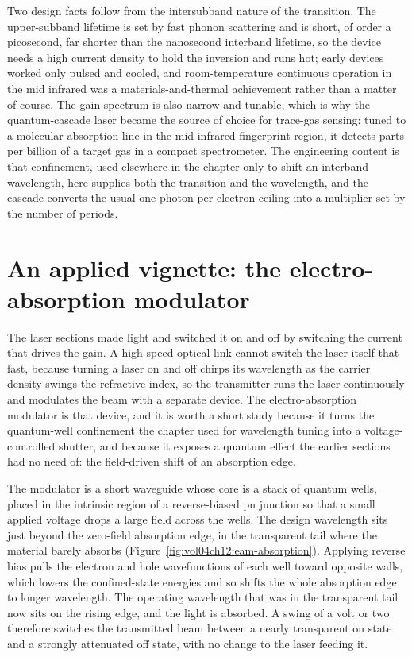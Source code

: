 Two design facts follow from the intersubband nature of the transition.
The upper-subband lifetime is set by fast phonon scattering and is short,
of order a picosecond, far shorter than the nanosecond interband lifetime,
so the device needs a high current density to hold the inversion and runs
hot; early devices worked only pulsed and cooled, and room-temperature
continuous operation in the mid infrared was a materials-and-thermal
achievement rather than a matter of course. The gain spectrum is also
narrow and tunable, which is why the quantum-cascade laser became the
source of choice for trace-gas sensing: tuned to a molecular absorption
line in the mid-infrared fingerprint region, it detects parts per billion
of a target gas in a compact spectrometer. The engineering content is that
confinement, used elsewhere in the chapter only to shift an interband
wavelength, here supplies both the transition and the wavelength, and the
cascade converts the usual one-photon-per-electron ceiling into a
multiplier set by the number of periods.



\section{An applied vignette: the electro-absorption modulator}

The laser sections made light and switched it on and off by switching the
current that drives the gain. A high-speed optical link cannot switch the laser
itself that fast, because turning a laser on and off chirps its wavelength as
the carrier density swings the refractive index, so the transmitter runs the
laser continuously and modulates the beam with a separate device. The
electro-absorption modulator is that device, and it is worth a short study
because it turns the quantum-well confinement the chapter used for wavelength
tuning into a voltage-controlled shutter, and because it exposes a quantum
effect the earlier sections had no need of: the field-driven shift of an
absorption edge.

The modulator is a short waveguide whose core is a stack of quantum wells,
placed in the intrinsic region of a reverse-biased pn junction so that a small
applied voltage drops a large field across the wells. The design wavelength sits
just beyond the zero-field absorption edge, in the transparent tail where the
material barely absorbs (Figure~\ref{fig:vol04ch12:eam-absorption}). Applying
reverse bias pulls the electron and hole wavefunctions of each well toward
opposite walls, which lowers the confined-state energies and so shifts the whole
absorption edge to longer wavelength. The operating wavelength that was in the
transparent tail now sits on the rising edge, and the light is absorbed. A swing
of a volt or two therefore switches the transmitted beam between a nearly
transparent on state and a strongly attenuated off state, with no change to the
laser feeding it.

